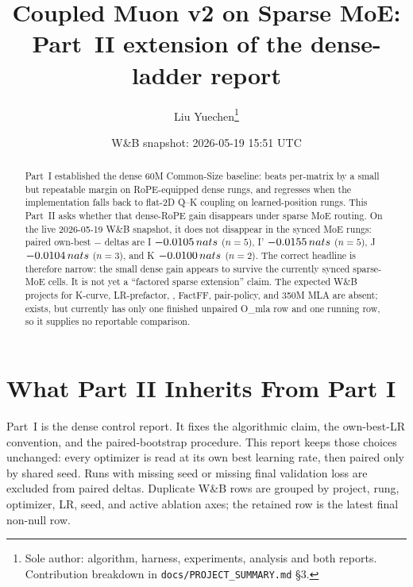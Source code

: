 \documentclass[11pt,a4paper]{article}
\title{Coupled Muon v2 on Sparse MoE:\\
\large Part~II extension of the dense-ladder report}
\author{Liu Yuechen\thanks{Sole author: algorithm, harness, experiments, analysis and both reports. Contribution breakdown in \texttt{docs/PROJECT\_SUMMARY.md} \S3.}}
\date{W\&B snapshot: 2026-05-19 15:51 UTC}
\begin{document}
\maketitle
\begin{center}\end{center}

\begin{abstract}
\noindent
Part~I established the dense 60M Common-Size baseline: \optCoupled{} beats per-matrix \optMuon{} by a small but repeatable margin on RoPE-equipped dense rungs, and regresses when the implementation falls back to flat-2D Q--K coupling on learned-position rungs. This Part~II asks whether that dense-RoPE gain disappears under sparse MoE routing. On the live 2026-05-19 W\&B snapshot, it does not disappear in the synced MoE rungs: paired own-best \optCoupled{}$-$\optMuon{} deltas are I $-0.0105\,nats{}$ ($n{=}5$), I' $-0.0155\,nats{}$ ($n{=}5$), J $-0.0104\,nats{}$ ($n{=}3$), and K $-0.0100\,nats{}$ ($n{=}2$). The correct headline is therefore narrow: the small dense gain appears to survive the currently synced sparse-MoE cells. It is not yet a ``factored sparse extension'' claim. The expected W\&B projects for K-curve, LR-prefactor, , FactFF, pair-policy, and 350M MLA are absent;  exists, but currently has only one finished unpaired O\_mla row and one running row, so it supplies no reportable comparison.
\end{abstract}

\section{What Part II Inherits From Part I}

Part~I is the dense control report. It fixes the algorithmic claim, the own-best-LR convention, and the paired-bootstrap procedure. This report keeps those choices unchanged: every optimizer is read at its own best learning rate, then paired only by shared seed. Runs with missing seed or missing final validation loss are excluded from paired deltas. Duplicate W\&B rows are grouped by project, rung, optimizer, LR, seed, and active ablation axes; the retained row is the latest final non-null row.
\end{document}
